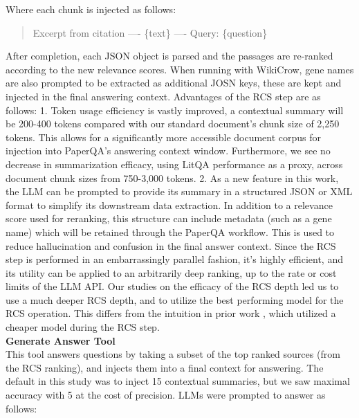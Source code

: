 \documentclass{article}
\begin{document}
Where each chunk is injected as follows:
\begin{quote}
    Excerpt from {citation}
    ----
    \{text\}
    ----
    Query: \{question\}
\end{quote}

After completion, each JSON object is parsed and the passages are re-ranked according to the new relevance scores. When running with WikiCrow, gene names are also prompted to be extracted as additional JOSN keys, these are kept and injected in the final answering context. Advantages of the RCS step are as follows: 1. Token usage efficiency is vastly improved, a contextual summary will be 200-400 tokens compared with our standard document's chunk size of 2,250 tokens. This allows for a significantly more accessible document corpus for injection into PaperQA's answering context window. Furthermore, we see no decrease in summarization efficacy, using LitQA performance as a proxy, across document chunk sizes from 750-3,000 tokens. 2. As a new feature in this work, the LLM can be prompted to provide its summary in a structured JSON or XML format to simplify its downstream data extraction. In addition to a relevance score used for reranking, this structure can include metadata (such as a gene name) which will be retained through the PaperQA workflow. This is used to reduce hallucination and confusion in the final answer context. Since the RCS step is performed in an embarrassingly parallel fashion, it's highly efficient, and its utility can be applied to an arbitrarily deep ranking, up to the rate or cost limits of the LLM API. Our studies on the efficacy of the RCS depth led us to use a much deeper RCS depth, and to utilize the best performing model for the RCS operation. This differs from the intuition in prior work \cite{lala2023paperqa}, which utilized a cheaper model during the RCS step. \\

\textbf{Generate Answer Tool} \\

This tool answers questions by taking a subset of the top ranked sources (from the RCS ranking), and injects them into a final context for answering. The default in this study was to inject 15 contextual summaries, but we saw maximal accuracy with 5 at the cost of precision. LLMs were prompted to answer as follows:
\end{document}
